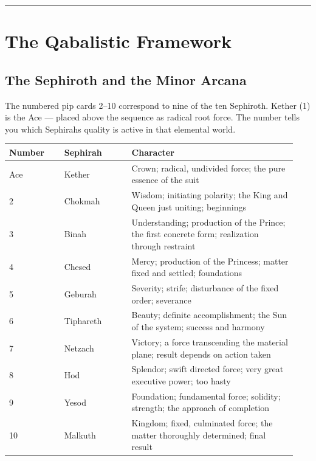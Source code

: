 \begin{center}\rule{0.5\linewidth}{0.5pt}\end{center}

\section{The Qabalistic Framework}\label{the-qabalistic-framework}

\subsection{The Sephiroth and the Minor Arcana}\label{the-sephiroth-and-the-minor-arcana}

The numbered pip cards 2--10 correspond to nine of the ten Sephiroth. Kether (1) is the Ace --- placed above the sequence as radical root force. The number tells you which Sephirah\textquotesingle s quality is active in that elemental world.

\begin{longtable}[]{@{}>{\RaggedRight\small}p{0.18\linewidth}>{\RaggedRight\small}p{0.22\linewidth}>{\RaggedRight\small}p{0.54\linewidth}@{}}
\toprule\noalign{}
Number & Sephirah & Character \\
\midrule\noalign{}
\endhead
\bottomrule\noalign{}
\endlastfoot
Ace & Kether & Crown; radical, undivided force; the pure essence of the suit \\
2 & Chokmah & Wisdom; initiating polarity; the King and Queen just uniting; beginnings \\
3 & Binah & Understanding; production of the Prince; the first concrete form; realization through restraint \\
4 & Chesed & Mercy; production of the Princess; matter fixed and settled; foundations \\
5 & Geburah & Severity; strife; disturbance of the fixed order; severance \\
6 & Tiphareth & Beauty; definite accomplishment; the Sun of the system; success and harmony \\
7 & Netzach & Victory; a force transcending the material plane; result depends on action taken \\
8 & Hod & Splendor; swift directed force; very great executive power; too hasty \\
9 & Yesod & Foundation; fundamental force; solidity; strength; the approach of completion \\
10 & Malkuth & Kingdom; fixed, culminated force; the matter thoroughly determined; final result \\
\end{longtable}

